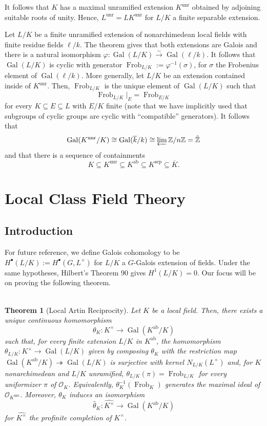 \documentclass[11pt]{article}
\newcommand{\Z}{\mathbb{Z}}
\newcommand{\iso}{\cong}
\newcommand{\mc}[1]{\mathcal{#1}}
\newcommand{\ov}[1]{\overline{#1}}
\newcommand{\surj}{\twoheadrightarrow}
\newcommand{\xto}[1]{\xrightarrow{#1}}
\DeclareMathOperator{\ab}{ab} %
\DeclareMathOperator{\Frob}{Frob} %
\DeclareMathOperator{\Gal}{Gal}
\DeclareMathOperator{\sep}{sep} %
\DeclareMathOperator{\unr}{unr} %
\renewcommand{\subset}{\subseteq}
\renewcommand{\phi}{\varphi}
\renewcommand{\O}{\mc{O}}
\renewcommand{\l}{\ell}
\newcommand{\flim}{\varprojlim}
\newtheorem*{theorem*}{\\Theorem}
\begin{document}
It follows that $K$ has a maximal unramified extension $K^{\unr}$ obtained by adjoining suitable roots of unity. Hence, $L^{\unr}=LK^{\unr}$ for $L/K$ a finite separable extension. 

Let $L/K$ be a finite unramified extension of nonarchimedean local fields with finite residue fields $\l/k$. The theorem gives that both extensions are Galois and there is a natural isomorphism $\phi: \Gal(L/K)\xto{\sim}\Gal(\l/k)$. It follows that $\Gal(L/K)$ is cyclic with generator $\Frob_{L/K}:=\phi^{-1}(\sigma)$, for $\sigma$ the Frobenius element of $\Gal(\l/k)$. More generally, let $L/K$ be an extension contained inside of $K^{\unr}$. Then, $\Frob_{L/K}$ is the unique element of $\Gal(L/K)$ such that 
$$\Frob_{L/K}|_E=\Frob_{E/K}$$
for every $K\subset E\subset L$ with $E/K$ finite (note that we have implicitly used that subgroups of cyclic groups are cyclic with ``compatible'' generators). It follows that 
$$\Gal(K^{\unr}/K)\iso\Gal(\ov{k}/k)\iso\flim\Z/n\Z=\hat{\Z}$$
and that there is a sequence of containments
$$K\subset K^{\unr}\subset K^{\ab}\subset K^{\sep}\subset\ov{K}.$$

\section{Local Class Field Theory}
\subsection{Introduction}
For future reference, we define Galois cohomology to be $H^{\bullet}(L/K):=H^{\bullet}(G,L^{\times})$ for $L/K$ a $G$-Galois extension of fields. Under the same hypotheses, Hilbert's Theorem 90 gives $H^1(L/K)=0$. Our focus will be on proving the following theorem.

\begin{theorem*}[Local Artin Reciprocity]
Let $K$ be a local field. Then, there exists a unique continuous homomorphism 
$$\theta_K: K^{\times}\to\Gal(K^{\ab}/K)$$
such that, for every finite extension $L/K$ in $K^{\ab}$, the homomorphism $\theta_{L/K}: K^{\times}\to\Gal(L/K)$ given by composing $\theta_K$ with the restriction map $\Gal(K^{\ab}/K)\surj\Gal(L/K)$ is surjective with kernel $N_{L/K}(L^{\times})$ and, for $K$ nonarchimedean and $L/K$ unramified, $\theta_{L/K}(\pi)=\Frob_{L/K}$ for every uniformizer $\pi$ of $\O_K$. Equivalently, $\theta_K^{-1}(\Frob_K)$ generates the maximal ideal of $\O_{K^{\unr}}$. Moreover, $\theta_K$ induces an isomorphism 
$$\hat{\theta}_K: \widehat{K^{\times}}\to\Gal(K^{\ab}/K)$$
for $\widehat{K^{\times}}$ the profinite completion of $K^{\times}$.
\end{theorem*}
\end{document}
